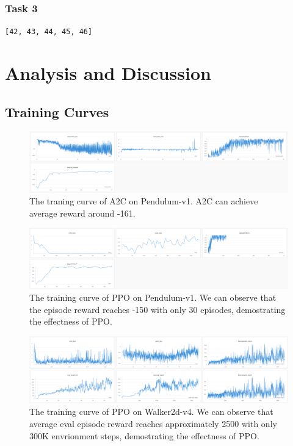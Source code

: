 \documentclass[a4paper,twocolumn]{article}
\begin{document}
\subsubsection{Task 3}
\texttt{[42, 43, 44, 45, 46]}

\section{Analysis and Discussion}

\subsection{Training Curves}

\begin{figure}[H]
\centering
\includegraphics[width=0.95\linewidth]{figures/curve_a2c}
\caption{The traning curve of A2C on Pendulum-v1. A2C can achieve average reward around -161.}
\label{fig:curvea2c}
\end{figure}


\begin{figure}[H]
\centering
\includegraphics[width=0.95\linewidth]{figures/curve_ppo}
\caption{The training curve of PPO on Pendulum-v1. We can observe that the episode reward reaches -150 with only 30 episodes, demostrating the effectness of PPO.}
\label{fig:curveppo}
\end{figure}

\begin{figure}[H]
\centering
\includegraphics[width=0.95\linewidth]{figures/curve_ppo_walker}
\caption{The training curve of PPO on Walker2d-v4. We can observe that average eval episode reward reaches approximately 2500 with only 300K envrionment steps, demostrating the effectness of PPO.}
\label{fig:curveppowalker}
\end{figure}
\end{document}
